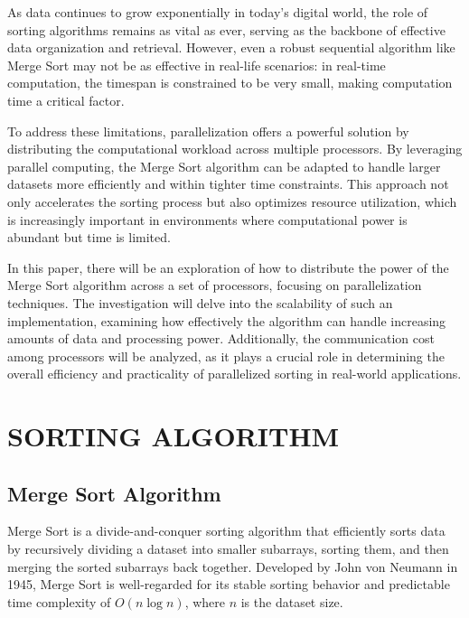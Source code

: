 \documentclass[article,12pt,conference]{ieeeconf} %
\begin{document}
As data continues to grow exponentially in today's digital world, the role of sorting algorithms remains as vital as ever, serving as the backbone of effective data organization and retrieval. However, even a robust sequential algorithm like Merge Sort may not be as effective in real-life scenarios: in real-time computation, the timespan is constrained to be very small, making computation time a critical factor.\par

To address these limitations, parallelization offers a powerful solution by distributing the computational workload across multiple processors. By leveraging parallel computing, the Merge Sort algorithm can be adapted to handle larger datasets more efficiently and within tighter time constraints. This approach not only accelerates the sorting process but also optimizes resource utilization, which is increasingly important in environments where computational power is abundant but time is limited.\par

In this paper, there will be an exploration of how to distribute the power of the Merge Sort algorithm across a set of processors, focusing on parallelization techniques. The investigation will delve into the scalability of such an implementation, examining how effectively the algorithm can handle increasing amounts of data and processing power. Additionally, the communication cost among processors will be analyzed, as it plays a crucial role in determining the overall efficiency and practicality of parallelized sorting in real-world applications.

\section{SORTING ALGORITHM}

\subsection{Merge Sort Algorithm}
Merge Sort\cite{von1956new} is a divide-and-conquer sorting algorithm that efficiently sorts data by recursively dividing a dataset into smaller subarrays, sorting them, and then merging the sorted subarrays back together. Developed by John von Neumann in 1945, Merge Sort is well-regarded for its stable sorting behavior and predictable time complexity of $O(n \log n)$, where $n$ is the dataset size.
\end{document}
